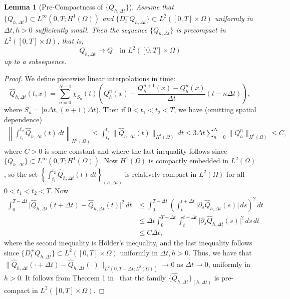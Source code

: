 \documentclass[10pt,letterpaper]{amsart}
\newtheorem{lemma}{Lemma}[section]
\theoremstyle{definition}{\newtheorem{definition}[lemma]{Definition}}
\theoremstyle{note}{\newtheorem{claim}{Claim}[section]
\newtheorem*{claim*}{Claim}}
\numberwithin{equation}{section}
\begin{document}
\begin{lemma}[Pre-Compactness of $\{Q_{h,\Delta t}\}$]
\label{conj:precompactness}
Assume that $\{Q_{h,\Delta t}\}\subset L^\infty(0,T; H^1(\Omega))$ and $\{D_t^+ Q_{h,\Delta t}\}\subset L^2([0,T]\times\Omega)$ uniformly in $\Delta t, h>0$ sufficiently small. Then the sequence $\{Q_{h,\Delta t}\}$ is precompact in $L^2([0,T]\times\Omega)$, that is,
\[
    Q_{h,\Delta t} \to Q\quad\text{in } L^2([0,T]\times\Omega)
\]
up to a subsequence.
\end{lemma}
\begin{proof}
We define piecewise linear interpolations in time:
\[
    \widehat{Q}_{h,\Delta t}(t, x) = \sum_{n=0}^{N-1} \chi_{S_n}(t)\left(Q_h^n(x) + \frac{Q_h^{n+1}(x) - Q_h^n(x)}{\Delta t}(t - n\Delta t)\right),
\]
where $S_n=[n\Delta t,(n+1)\Delta t)$. Then if $0 < t_1 < t_2 < T$, we have (omitting spatial dependence)
\begin{align*}
    \left\|\int_{t_1}^{t_2} \widehat{Q}_{h,\Delta t}(t)\, dt\right\|_{H^1(\Omega)} \le \int_{t_1}^{t_2} \|\widehat{Q}_{h,\Delta t}(t)\|_{H^1(\Omega)}\, dt \le 3\Delta t\sum_{n=0}^{N}\|Q_h^n\|_{H^1(\Omega)} \le C,
\end{align*}
where $C>0$ is some constant and where the last inequality follows since $\{Q_{h,\Delta t}\}\subset L^\infty(0,T;H^1(\Omega))$. Now $H^1(\Omega)$ is compactly embedded in $L^2(\Omega)$, so the set $\left\{\int_{t_1}^{t_2} \widehat{Q}_{h,\Delta t}(t)\, dt\right\}_{(h,\Delta t)}$ is relatively compact in $L^2(\Omega)$ for all $0<t_1<t_2<T$. 
Now 
\begin{align*}
    \int_0^{T-\Delta t} \lvert \widehat{Q}_{h,\Delta t}(t+\Delta t) - \widehat{Q}_{h,\Delta t}(t)\rvert^2\, dt
    &\le \int_0^{T-\Delta t} \left(\int_{t}^{t+\Delta t} \lvert \partial_s\widehat{Q}_{h,\Delta t}(s)\rvert\, ds\right)^2\, dt\\
    &\le \Delta t\int_0^{T-\Delta t} \int_t^{t+\Delta t}\lvert \partial_s \widehat{Q}_{h,\Delta t}(s)\rvert^2\, ds\, dt\\
    &\le C\Delta t,
\end{align*}
where the second inequality is H\"{o}lder's inequality, and the last inequality follows since $\{D_t^+ Q_{h,\Delta t}\}\subset L^2([0,T]\times\Omega)$ uniformly in $\Delta t, h>0$. Thus, we have that $\| \widehat{Q}_{h,\Delta t}(\cdot+\Delta t) - \widehat{Q}_{h,\Delta t}(\cdot)\|_{L^2(0,T-\Delta t; L^2(\Omega))} \to 0$ as $\Delta t\to 0$, uniformly in $h>0$. It follows from Theorem 1 in~\cite{Simon1986} that the family $\{\widehat{Q}_{h,\Delta t}\}_{(h,\Delta t)}$ is pre-compact in $L^2([0,T]\times\Omega)$. 


\end{proof}
\end{document}
